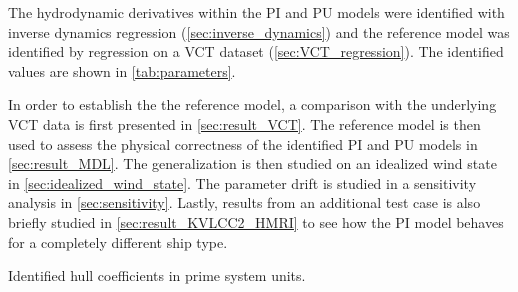The hydrodynamic derivatives within the PI and PU models were identified with inverse dynamics regression (\autoref{sec:inverse_dynamics}) and the reference model was identified by regression on a VCT dataset (\autoref{sec:VCT_regression}). The identified values are shown in \autoref{tab:parameters}. 

In order to establish the the reference model, a comparison with the underlying VCT data is first presented in \autoref{sec:result_VCT}. The reference model is then used to assess the physical correctness of the identified PI and PU models in \autoref{sec:result_MDL}. 
The generalization is then studied on an idealized wind state in \autoref{sec:idealized_wind_state}.
The parameter drift is studied in a sensitivity analysis in \autoref{sec:sensitivity}. 
Lastly, results from an additional test case is also briefly studied in \autoref{sec:result_KVLCC2_HMRI} to see how the PI model behaves for a completely different ship type.

\begin{table}[h]
    \centering
    \caption{Identified hull coefficients in prime system units.}
    \label{tab:parameters}
\end{table}
